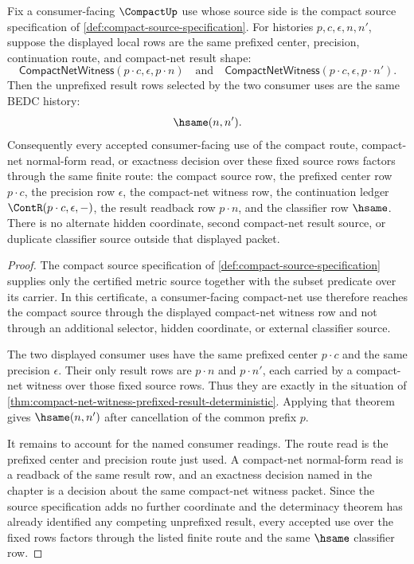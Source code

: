 \begin{corollary}
\label{cor:compact-source-specification-route-determinacy}
Fix a consumer-facing $\CompactUp$ use whose source side is the compact source specification of \autoref{def:compact-source-specification}. For histories $p,c,\epsilon,n,n'$, suppose the displayed local rows are the same prefixed center, precision, continuation route, and compact-net result shape:
$$
\mathsf{CompactNetWitness}(p\cdot c,\epsilon,p\cdot n)
\quad\text{and}\quad
\mathsf{CompactNetWitness}(p\cdot c,\epsilon,p\cdot n').
$$
Then the unprefixed result rows selected by the two consumer uses are the same BEDC history:
$$
\hsame(n,n').
$$
Consequently every accepted consumer-facing use of the compact route, compact-net normal-form read, or exactness decision over these fixed source rows factors through the same finite route: the compact source row, the prefixed center row $p\cdot c$, the precision row $\epsilon$, the compact-net witness row, the continuation ledger $\ContR(p\cdot c,\epsilon,-)$, the result readback row $p\cdot n$, and the classifier row $\hsame$. There is no alternate hidden coordinate, second compact-net result source, or duplicate classifier source outside that displayed packet.
\end{corollary}
\begin{proof}
The compact source specification of \autoref{def:compact-source-specification} supplies only the certified metric source together with the subset predicate over its carrier. In this certificate, a consumer-facing compact-net use therefore reaches the compact source through the displayed compact-net witness row and not through an additional selector, hidden coordinate, or external classifier source.

The two displayed consumer uses have the same prefixed center $p\cdot c$ and the same precision $\epsilon$. Their only result rows are $p\cdot n$ and $p\cdot n'$, each carried by a compact-net witness over those fixed source rows. Thus they are exactly in the situation of \autoref{thm:compact-net-witness-prefixed-result-deterministic}. Applying that theorem gives $\hsame(n,n')$ after cancellation of the common prefix $p$.

It remains to account for the named consumer readings. The route read is the prefixed center and precision route just used. A compact-net normal-form read is a readback of the same result row, and an exactness decision named in the chapter is a decision about the same compact-net witness packet. Since the source specification adds no further coordinate and the determinacy theorem has already identified any competing unprefixed result, every accepted use over the fixed rows factors through the listed finite route and the same $\hsame$ classifier row.
\end{proof}
